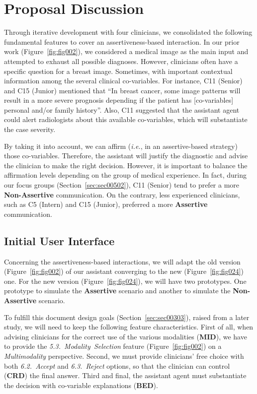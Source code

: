 \section{Proposal Discussion}
\label{sec:sec007}

Through iterative development with four clinicians, we consolidated the following fundamental features to cover an assertiveness-based interaction.
In our prior work (Figure~\ref{fig:fig002}), we considered a medical image as the main input and attempted to exhaust all possible diagnoses.
However, clinicians often have a specific question for a breast image.
Sometimes, with important contextual information among the several clinical co-variables.
For instance, C11 (Senior) and C15 (Junior) mentioned that ``In breast cancer, some image patterns will result in a more severe prognosis depending if the patient has [co-variables] personal and/or family history''.
Also, C11 suggested that the assistant agent could alert radiologists about this available co-variables, which will substantiate the case severity.

By taking it into account, we can affirm ({\it i.e.}, in an assertive-based strategy) those co-variables.
Therefore, the assistant will justify the diagnostic and advise the clinician to make the right decision.
However, it is important to balance the affirmation levels depending on the group of medical experience.
In fact, during our focus groups (Section~\ref{sec:sec00502}), C11 (Senior) tend to prefer a more {\bf Non-Assertive} communication.
On the contrary, less experienced clinicians, such as C5 (Intern) and C15 (Junior), preferred a more {\bf Assertive} communication.

\subsection{Initial User Interface}
\label{sec:sec00701}

Concerning the assertiveness-based interactions, we will adapt the old version (Figure~\ref{fig:fig002}) of our assistant converging to the new (Figure~\ref{fig:fig024}) one.
For the new version (Figure~\ref{fig:fig024}), we will have two prototypes.
One prototype to simulate the {\bf Assertive} scenario and another to simulate the {\bf Non-Assertive} scenario.

To fulfill this document design goals (Section~\ref{sec:sec00303}), raised from a later study, we will need to keep the following feature characteristics.
First of all, when advising clinicians for the correct use of the various modalities ({\bf MID}), we have to provide the {\it 5.3.~Modality~Selection} feature (Figure~\ref{fig:fig002}) on a {\it Multimodality} perspective.
Second, we must provide clinicians' free choice with both {\it 6.2.~Accept} and {\it 6.3.~Reject} options, so that the clinician can control ({\bf CRD}) the final answer.
Third and final, the assistant agent must substantiate the decision with co-variable explanations ({\bf BED}).


